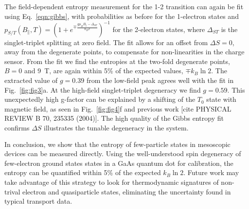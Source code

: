 \documentclass[twocolumn,showpacs,preprintnumbers,amsmath,amssymb,pra,aps,superscriptaddress]{revtex4-1}
\begin{document}
The field-dependent entropy measurement for the 1-2 transition can again be fit using Eq.~\ref{eqn:gibbs}, with probabilities as before for the 1-electron states and $p_{S/T}(B_\parallel, T) = (1+ e^{\mp \frac{g\mu_B B_\parallel - \Delta_{ST}}{k_B T}})^{-1}$ for the 2-electron states, where $\Delta_{ST}$ is the singlet-triplet splitting at zero field. The fit allows for an offset from $\Delta S=0$, away from the degenerate points, to compensate for non-linearities in the charge sensor. From the fit we find the entropies at the two-fold degenerate points, $B=0$ and \SI{9}{\tesla}, are again within 5\% of the expected values, $\mp k_B \ln{2}$. The extracted value of $g = 0.39$ from the low-field peak agrees well with the fit in Fig.~\ref{fig:fig3}a. At the high-field singlet-triplet degeneracy we find $g = 0.59$. This unexpectedly high g-factor can be explained by a shifting of the $T_{0}$ state with magnetic field, as seen in Fig.~\ref{fig:fig4}f and previous work [cite PHYSICAL REVIEW B 70, 235335 (2004)]. The high quality of the Gibbs entropy fit confirms $\Delta S$ illustrates the tunable degeneracy in the system.

In conclusion, we show that the entropy of few-particle states in mesoscopic devices can be measured directly.  Using the well-understood spin degeneracy of  few-electron ground states states in a GaAs quantum dot for calibration, the entropy can be quantified within 5\% of the expected $k_B\ln{2}$.  Future work may take advantage of this strategy to look for thermodynamic signatures of non-trival electron and quasiparticle states, eliminating the uncertainty found in typical transport data.
\end{document}
